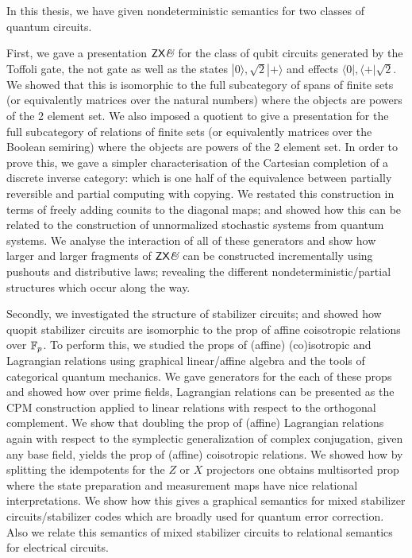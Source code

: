 
In this thesis, we have given nondeterministic semantics for two classes of quantum circuits.  


First, we gave a presentation $\mathsf{ZX}\textit{\&}$ for the  class of qubit circuits generated by the Toffoli gate, the not gate as well as the states $|0\rangle, \sqrt 2 |+\rangle$ and effects $\langle 0 |, \langle +|\sqrt{2}$.  We showed that this is isomorphic to the full subcategory of spans of finite sets (or equivalently matrices over the natural numbers) where the objects are powers of the 2 element set.  We also imposed a quotient to give a presentation for the full subcategory of relations of finite sets (or equivalently matrices over the Boolean semiring) where the objects are powers of the 2 element set.  In order to prove this, we gave a simpler characterisation of the Cartesian completion of a discrete inverse category: which is one half of the equivalence between partially reversible and partial computing with copying.  We restated this construction in terms of freely adding counits to the diagonal maps; and showed how this can be related to the construction of unnormalized stochastic systems from quantum systems.  We analyse the interaction of all of these generators and show how larger and larger fragments of $\mathsf{ZX}\textit{\&}$ can be constructed incrementally using pushouts and distributive laws; revealing the different nondeterministic/partial structures which occur along the way.


Secondly, we investigated the structure of stabilizer circuits; and showed how quopit stabilizer circuits are isomorphic to the prop of affine coisotropic relations over $\mathbb{F}_p$.  To perform this, we studied  the props of (affine) (co)isotropic and Lagrangian relations using graphical linear/affine algebra and the tools of categorical quantum mechanics.  We gave generators for the each of these props and showed how over prime fields, Lagrangian relations can be presented as the CPM construction applied to linear relations with respect to the orthogonal complement.  We show that doubling the prop of (affine) Lagrangian relations again with respect to the symplectic generalization of complex conjugation, given any base field, yields the prop of (affine) coisotropic relations.  We showed how by splitting the idempotents for the  $Z$ or $X$ projectors one obtains multisorted prop where the state preparation and measurement maps have nice relational interpretations.  We show how this gives a graphical semantics for mixed stabilizer circuits/stabilizer codes which are broadly used for quantum error correction.  Also we relate this semantics of mixed stabilizer circuits to relational semantics for electrical circuits.

